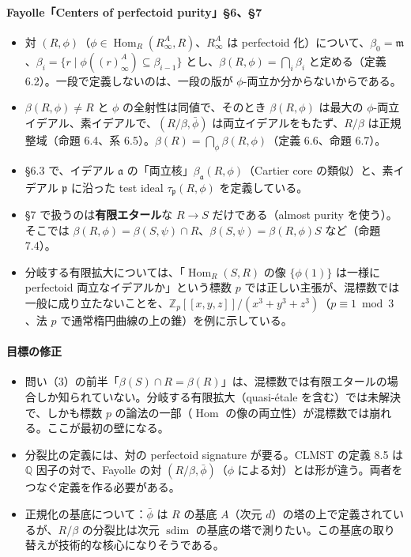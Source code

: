 \documentclass[11pt,a4paper]{ltjsarticle}
\theoremstyle{plain}
\theoremstyle{definition}
\theoremstyle{remark}
\theoremstyle{plain}
\newcommand{\m}{\mathfrak{m}}
\newcommand{\Hom}{\operatorname{Hom}}
\begin{document}
\paragraph{Fayolle「Centers of perfectoid purity」§6、§7}
\begin{itemize}
  \item 対 $(R,\phi)$（$\phi\in\Hom_R(R^A_\infty,R)$、$R^A_\infty$ は perfectoid 化）について、$\beta_0 = \m$、$\beta_i = \{r\mid\phi((r)^A_\infty)\subseteq\beta_{i-1}\}$ とし、$\beta(R,\phi) = \bigcap_i\beta_i$ と定める（定義 6.2）。一段で定義しないのは、一段の版が $\phi$-両立か分からないからである。
  \item $\beta(R,\phi)\neq R$ と $\phi$ の全射性は同値で、そのとき $\beta(R,\phi)$ は最大の $\phi$-両立イデアル、素イデアルで、$(R/\beta,\bar\phi)$ は両立イデアルをもたず、$R/\beta$ は正規整域（命題 6.4、系 6.5）。$\beta(R) = \bigcap_\phi\beta(R,\phi)$（定義 6.6、命題 6.7）。
  \item §6.3 で、イデアル $\mathfrak{a}$ の「両立核」$\beta_{\mathfrak{a}}(R,\phi)$（Cartier core の類似）と、素イデアル $\mathfrak{p}$ に沿った test ideal $\tau_{\mathfrak{p}}(R,\phi)$ を定義している。
  \item §7 で扱うのは\textbf{有限エタール}な $R\to S$ だけである（almost purity を使う）。そこでは $\beta(R,\phi) = \beta(S,\psi)\cap R$、$\beta(S,\psi) = \beta(R,\phi)S$ など（命題 7.4）。
  \item 分岐する有限拡大については、「$\Hom_R(S,R)$ の像 $\{\phi(1)\}$ は一様に perfectoid 両立なイデアルか」という標数 $p$ では正しい主張が、混標数では一般に成り立たないことを、$\mathbb{Z}_p[[x,y,z]]/(x^3+y^3+z^3)$（$p\equiv1\bmod 3$、法 $p$ で通常楕円曲線の上の錐）を例に示している。
\end{itemize}

\paragraph{目標の修正}
\begin{itemize}
  \item 問い（3）の前半「$\beta(S)\cap R = \beta(R)$」は、混標数では有限エタールの場合しか知られていない。分岐する有限拡大（quasi-étale を含む）では未解決で、しかも標数 $p$ の論法の一部（$\Hom$ の像の両立性）が混標数では崩れる。ここが最初の壁になる。
  \item 分裂比の定義には、対の perfectoid signature が要る。CLMST の定義 8.5 は $\mathbb{Q}$ 因子の対で、Fayolle の対 $(R/\beta,\bar\phi)$（$\phi$ による対）とは形が違う。両者をつなぐ定義を作る必要がある。
  \item 正規化の基底について：$\bar\phi$ は $R$ の基底 $A$（次元 $d$）の塔の上で定義されているが、$R/\beta$ の分裂比は次元 $\operatorname{sdim}$ の基底の塔で測りたい。この基底の取り替えが技術的な核心になりそうである。
\end{itemize}
\end{document}
